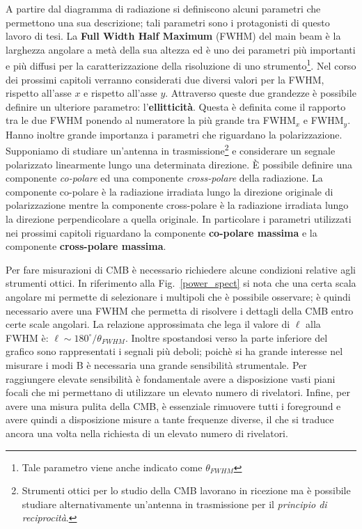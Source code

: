 \documentclass[12pt,a4paper,final]{book}
\begin{document}
A partire dal diagramma di radiazione si definiscono alcuni parametri che permettono una sua descrizione; tali parametri sono i protagonisti di questo lavoro di tesi.
La \textbf{Full Width Half Maximum} (FWHM) del main beam è la larghezza angolare a metà della sua altezza ed è uno dei parametri più importanti e più diffusi per la caratterizzazione della risoluzione di uno strumento\footnote{Tale parametro viene anche indicato come $\theta_{FWHM}$}. Nel corso dei prossimi capitoli verranno considerati due diversi valori per la FWHM, rispetto all'asse $x$ e rispetto all'asse $y$. Attraverso queste due grandezze è possibile definire un ulteriore parametro: l'\textbf{ellitticità}. Questa è definita come il rapporto tra le due FWHM ponendo al numeratore la più grande tra FWHM$_x$ e FWHM$_y$.
Hanno inoltre grande importanza i parametri che riguardano la polarizzazione. Supponiamo di studiare un'antenna in trasmissione\footnote{Strumenti ottici per lo studio della CMB lavorano in ricezione ma è possibile studiare alternativamente un'antenna in trasmissione per il \textit{principio di reciprocità}.} e considerare un segnale polarizzato linearmente lungo una determinata direzione.
\`E possibile definire una componente \textit{co-polare} ed una componente \textit{cross-polare} della radiazione. La componente co-polare è la radiazione irradiata lungo la direzione originale di polarizzazione mentre la componente cross-polare è la radiazione irradiata lungo la direzione perpendicolare a quella originale.
In particolare i parametri utilizzati nei prossimi capitoli riguardano la componente \textbf{co-polare massima} e la componente \textbf{cross-polare massima}.


Per fare misurazioni di CMB è necessario richiedere alcune condizioni relative agli strumenti ottici. In riferimento alla Fig.~\ref{power_spect} si nota che una certa scala angolare mi permette di selezionare i multipoli che è possibile osservare; è quindi necessario avere una FWHM che permetta di risolvere i dettagli della CMB entro certe scale angolari. La relazione approssimata che lega il valore di $\ell$ alla FWHM è: $\ell\sim{180^{\circ}}/{\theta_{FWHM}}$.
Inoltre spostandosi verso la parte inferiore del grafico sono rappresentati i segnali più deboli; poichè si ha grande interesse nel misurare i modi B è necessaria una grande sensibilità strumentale. Per raggiungere elevate sensibilità è fondamentale avere a disposizione vasti piani focali che mi permettano di utilizzare un elevato numero di rivelatori.
Infine, per avere una misura pulita della CMB, è essenziale rimuovere tutti i foreground e avere quindi a disposizione misure a tante frequenze diverse, il che si traduce ancora una volta nella richiesta di un elevato numero di rivelatori.
\end{document}
